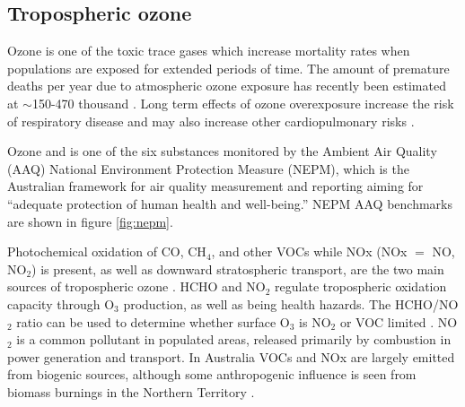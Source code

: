 \subsection{Tropospheric ozone}

Ozone is one of the toxic trace gases which increase mortality rates when populations are exposed for extended periods of time.
The amount of premature deaths per year due to atmospheric ozone exposure has recently been estimated at $\sim$150-470 thousand \cite{Silva_2013, Lelieveld_2015}.
Long term effects of ozone overexposure increase the risk of respiratory disease and may also increase other cardiopulmonary risks \cite{Jerrett_2009}.

Ozone and is one of the six substances monitored by the Ambient Air Quality (AAQ) National Environment Protection Measure (NEPM), which is the Australian framework for air quality measurement and reporting aiming for ``adequate protection of human health and well-being.''
NEPM AAQ benchmarks are shown in figure \ref{fig:nepm}.

Photochemical oxidation of CO, CH$_4$, and other VOCs while NOx (NOx $=$ NO, NO$_2$) is present, as well as downward stratospheric transport, are the two main sources of tropospheric ozone \cite{Stevenson_2006}.
HCHO and NO$_2$ regulate tropospheric oxidation capacity through O$_3$ production, as well as being health hazards.
The HCHO/NO$_2$ ratio can be used to determine whether surface O$_3$ is NO$_2$ or VOC limited \cite{Mahajan_2015}.
NO$_2$ is a common pollutant in populated areas, released primarily by combustion in power generation and transport. 
In Australia VOCs and NOx are largely emitted from biogenic sources, although some anthropogenic influence is seen from biomass burnings in the Northern Territory \cite{Guenther_2006, VanDerA_2008}.


